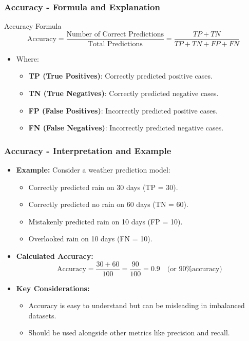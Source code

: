 \documentclass[aspectratio=169]{beamer}
\begin{document}
\begin{frame}[fragile]
    \frametitle{Accuracy - Formula and Explanation}
    \begin{block}{Accuracy Formula}
        \begin{equation}
            \text{Accuracy} = \frac{\text{Number of Correct Predictions}}{\text{Total Predictions}} = \frac{TP + TN}{TP + TN + FP + FN}
        \end{equation}
    \end{block}
    \begin{itemize}
        \item Where:
        \begin{itemize}
            \item \textbf{TP (True Positives)}: Correctly predicted positive cases.
            \item \textbf{TN (True Negatives)}: Correctly predicted negative cases.
            \item \textbf{FP (False Positives)}: Incorrectly predicted positive cases.
            \item \textbf{FN (False Negatives)}: Incorrectly predicted negative cases.
        \end{itemize}
    \end{itemize}
\end{frame}

\begin{frame}[fragile]
    \frametitle{Accuracy - Interpretation and Example}
    \begin{itemize}
        \item \textbf{Example:}
        Consider a weather prediction model:
        \begin{itemize}
            \item Correctly predicted rain on 30 days (TP = 30).
            \item Correctly predicted no rain on 60 days (TN = 60).
            \item Mistakenly predicted rain on 10 days (FP = 10).
            \item Overlooked rain on 10 days (FN = 10).
        \end{itemize}
        \item \textbf{Calculated Accuracy:}
        \begin{equation}
            \text{Accuracy} = \frac{30 + 60}{100} = \frac{90}{100} = 0.9 \quad \text{(or 90\% accuracy)}
        \end{equation}
        \item \textbf{Key Considerations:}
        \begin{itemize}
            \item Accuracy is easy to understand but can be misleading in imbalanced datasets.
            \item Should be used alongside other metrics like precision and recall.
        \end{itemize}
    \end{itemize}
\end{frame}
\end{document}
